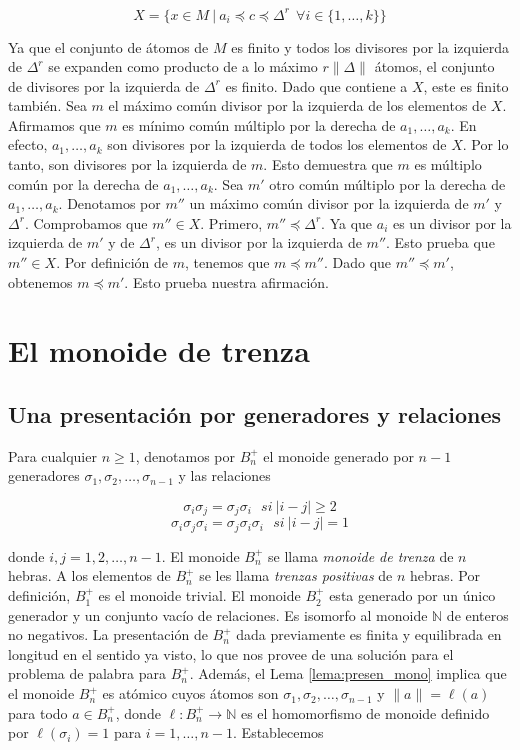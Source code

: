 \documentclass[12pt]{article}
\theoremstyle{definition}
\providecommand{\norm}[1]{\lVert#1\rVert}
\begin{document}
$$X=\{x\in M\ |\ a_i\preceq c\preceq\Delta^r\ \ \forall i\in\{1,\ldots,k\}\}$$

Ya que el conjunto de átomos de $M$ es finito y todos los divisores por la izquierda de $\Delta^r$ se expanden como producto de a lo máximo $r\norm{\Delta}$ átomos, el conjunto de divisores por la izquierda de $\Delta^r$ es finito. Dado que contiene a $X$, este es finito también. Sea $m$ el máximo común divisor por la izquierda de los elementos de $X$. Afirmamos que $m$ es mínimo común múltiplo por la derecha de $a_1,\ldots,a_k$. En efecto, $a_1,\ldots,a_k$ son divisores por la izquierda de todos los elementos de $X$. Por lo tanto, son divisores por la izquierda de $m$. Esto demuestra que $m$ es múltiplo común por la derecha de $a_1,\ldots,a_k$.
\newline
\newline
Sea $m'$ otro común múltiplo por la derecha de $a_1,\ldots,a_k$. Denotamos por $m''$ un máximo común divisor por la izquierda de $m'$ y $\Delta^r$. Comprobamos que $m''\in X$. Primero, $m''\preceq\Delta^r$. Ya que $a_i$ es un divisor por la izquierda de $m'$ y de $\Delta^r$, es un divisor por la izquierda de $m''$. Esto prueba que $m''\in X$. Por definición de $m$, tenemos que $m\preceq m''$. Dado que $m''\preceq m'$, obtenemos $m\preceq m'$. Esto prueba nuestra afirmación.

\section{El monoide de trenza}

\subsection{Una presentación por generadores y relaciones}

Para cualquier $n\geq 1$, denotamos por $B_n^+$ el monoide generado por $n-1$ generadores $\sigma_1,\sigma_2,\ldots,\sigma_{n-1}$ y las relaciones

$$\sigma_i\sigma_j=\sigma_j\sigma_i\ \ \ si\ |i-j|\geq 2$$
$$\sigma_i\sigma_j\sigma_i=\sigma_j\sigma_i\sigma_i\ \ \ si\ |i-j|= 1$$

donde $i,j=1,2,\ldots,n-1$. El monoide $B_n^+$ se llama \textit{monoide de trenza} de $n$ hebras. A los elementos de $B_n^+$ se les llama \textit{trenzas positivas} de $n$ hebras. Por definición, $B_1^+$ es el monoide trivial. El monoide $B_2^+$ esta generado por un único generador y un conjunto vacío de relaciones. Es isomorfo al monoide $\mathbb{N}$ de enteros no negativos.
\newline
\newline
La presentación de $B_n^+$ dada previamente es finita y equilibrada en longitud en el sentido ya visto, lo que nos provee de una solución para el problema de palabra para $B_n^+$. Además, el Lema \ref{lema:presen_mono} implica que el monoide $B_n^+$ es atómico cuyos átomos son $\sigma_1,\sigma_2,\ldots,\sigma_{n-1}$ y $\norm{a}=\ell(a)$ para todo $a\in B_n^+$, donde $\ell : B_n^+\rightarrow \mathbb{N}$ es el homomorfismo de monoide definido por $\ell(\sigma_i)=1$ para $i=1,\ldots,n-1$.
\newline
\newline
Establecemos
\end{document}
